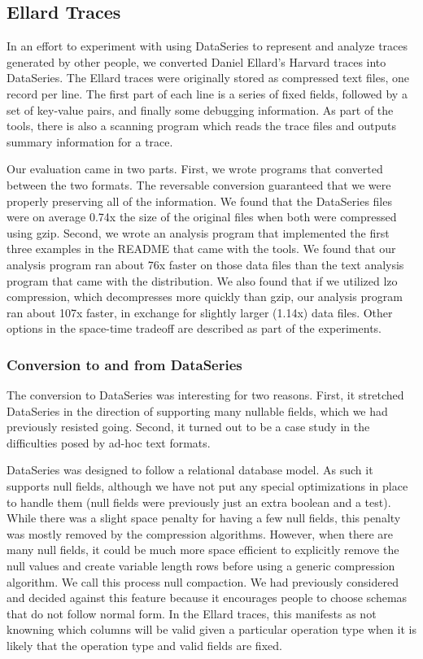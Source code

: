 \subsection{Ellard Traces}

In an effort to experiment with using DataSeries to represent and
analyze traces generated by other people, we converted Daniel Ellard's
Harvard traces\cite{ellard03} into DataSeries.  The Ellard traces
were originally stored as compressed text files, one record per line.
The first part of each line is a series of fixed fields, followed by a
set of key-value pairs, and finally some debugging information.  As
part of the tools, there is also a scanning program which reads the
trace files and outputs summary information for a trace.

Our evaluation came in two parts.  First, we wrote programs that
converted between the two formats.  The reversable conversion
guaranteed that we were properly preserving all of the information.
We found that the DataSeries files were on average 0.74x the size of
the original files when both were compressed using gzip.  Second, we
wrote an analysis program that implemented the first three examples in
the README that came with the tools.  We found that our analysis
program ran about 76x faster on those data files than the text
analysis program that came with the distribution.  
We also found that if we utilized lzo compression, which decompresses
more quickly than gzip,
our analysis program
ran about 107x faster, in exchange for slightly larger (1.14x) data files.
Other options in the space-time
tradeoff are described as part of the experiments.

\subsubsection{Conversion to and from DataSeries}

The conversion to DataSeries was interesting for two reasons.  First,
it stretched DataSeries in the direction of supporting many nullable
fields, which we had previously resisted going.  Second, it turned out
to be a case study in the difficulties posed by ad-hoc text formats.

DataSeries was designed to follow a relational database model.  As
such it supports null fields, although we have not put any special
optimizations in place to handle them (null fields were previously
just an extra boolean and a test).  While there was a slight space
penalty for having a few null fields, this penalty was mostly removed
by the compression algorithms.  However, when there are many null
fields, it could be much more space efficient to explicitly remove the
null values and create variable length rows before using a generic
compression algorithm.  We call this process null compaction.  We had
previously considered and decided against this feature because it
encourages people to choose schemas that do not follow normal form.
In the Ellard traces, this manifests as not knowning which columns
will be valid given a particular operation type when it is likely that
the operation type and valid fields are fixed.

